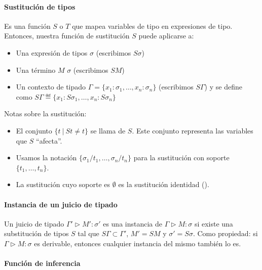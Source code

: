 \paragraph{Sustitución de tipos}

Es una función $S$ o $T$ que mapea variables de tipo en expresiones de tipo. Entonces, nuestra función de sustitución $S$ puede aplicarse a:
\begin{itemize}
  \item Una expresión de tipos $\sigma$ (escribimos $S\sigma$)
  \item Una término $M$ $\sigma$ (escribimos $SM$)
  \item Un contexto de tipado  $\Gamma = \{x_1:\sigma_1,\dots,x_n:\sigma_n\}$ (escribimos $S\Gamma$) y se define como $S\Gamma \eqdef \{x_1:S\sigma_1,\dots,x_n:S\sigma_n\}$
\end{itemize}

Notas sobre la sustitución:

\begin{itemize}
  \item El conjunto $\{t\ |\ St \neq t\}$ se llama  de $S$. Este conjunto representa las variables que $S$ ``afecta''.
  \item Usamos la notación $\{\sigma_1/t_1,\dots,\sigma_n/t_n\}$ para la sustitución con soporte $\{t_1,\dots,t_n\}$.
  \item La sustitución cuyo soporte es $\emptyset$ es la sustitución identidad ().
\end{itemize}

\paragraph{Instancia de un juicio de tipado}

Un juicio de tipado $\Gamma' \rhd M' : \sigma'$ es una instancia de $\Gamma \rhd M : \sigma$ si existe una substitución de tipos $S$ tal que $S\Gamma \subset \Gamma'$, $M' = SM$ y $\sigma' = S\sigma$. Como propiedad: si $\Gamma \rhd M : \sigma$ es derivable, entonces cualquier instancia del mismo también lo es.

\paragraph{Función de inferencia \w{\cdot}}

